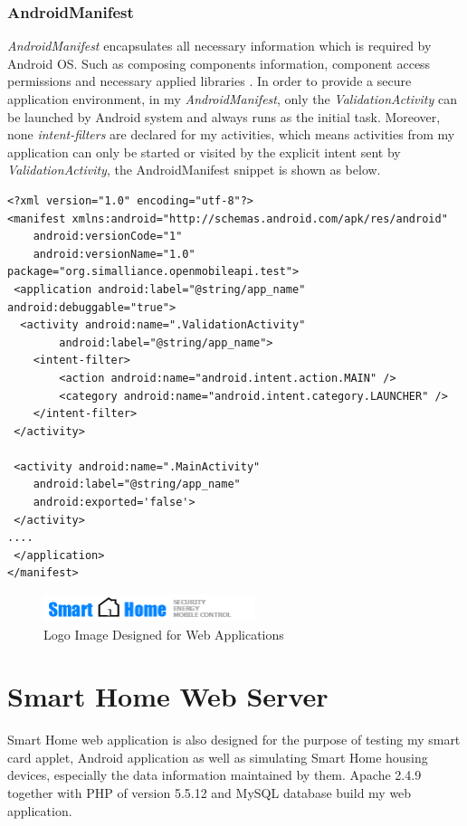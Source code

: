 \subsubsection{AndroidManifest}
\emph{AndroidManifest} encapsulates all necessary information which is required by Android OS. Such as composing components information, component access permissions and necessary applied libraries \cite{android_manifest}. In order to provide a secure application environment, in my \emph{AndroidManifest}, only the \emph{ValidationActivity} can be launched by Android system and always runs as the initial task. Moreover, none \emph{intent-filters} are declared for my activities, which means activities from my application can only be started or visited by the explicit intent sent by \emph{ValidationActivity}, the AndroidManifest snippet is shown as below.
\begin{Verbatim}[fontsize=\relsize{-1},frame=lines,framesep=4mm, label=\fbox{\small\emph{AndroidManifest.xml}}]
<?xml version="1.0" encoding="utf-8"?>
<manifest xmlns:android="http://schemas.android.com/apk/res/android"
	android:versionCode="1"
	android:versionName="1.0" package="org.simalliance.openmobileapi.test">
 <application android:label="@string/app_name" android:debuggable="true">
  <activity android:name=".ValidationActivity"
 		android:label="@string/app_name">
	<intent-filter>
		<action android:name="android.intent.action.MAIN" />
		<category android:name="android.intent.category.LAUNCHER" />
	</intent-filter>
 </activity>
      
 <activity android:name=".MainActivity"
	android:label="@string/app_name"
	android:exported='false'>
 </activity>
....
 </application>
</manifest> 
\end{Verbatim}



\begin{figure}[!htb]
	\centering
	\includegraphics[width=0.55\textwidth]{logo.png}
		\caption{Logo Image Designed for Web Applications}
	\label{fig:logo}
\end{figure}

\section{Smart Home Web Server} \label{secWEB}
Smart Home web application is also designed for the purpose of testing my smart card applet, Android application as well as simulating Smart Home housing devices, especially the data information maintained by them. Apache 2.4.9 together with PHP of version 5.5.12 and MySQL database build my web application.  

